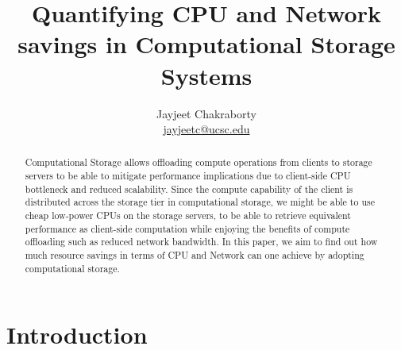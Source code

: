 \documentclass[11pt]{article}
\title{Quantifying CPU and Network savings in Computational Storage Systems}
\author{Jayjeet Chakraborty \\ \href{mailto:jayjeetc@ucsc.edu}{jayjeetc@ucsc.edu} }
\begin{document}
\maketitle

\begin{abstract}
Computational Storage allows offloading compute operations from clients to storage servers to be able to mitigate performance implications due to client-side CPU bottleneck and reduced scalability. Since the compute capability of the client is distributed across the storage tier in computational storage, we might be able to use cheap low-power CPUs on the storage servers, to be able to retrieve equivalent performance as client-side computation while enjoying the benefits of compute offloading such as reduced network bandwidth. In this paper, we aim to find out how much resource savings in terms of CPU and Network can one achieve by adopting computational storage. 
\end{abstract}

\section{Introduction}
\end{document}
